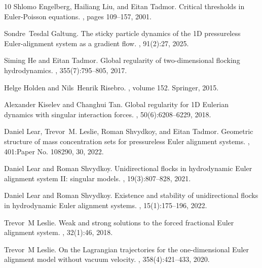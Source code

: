 \documentclass[11pt,reqno]{amsart}
\theoremstyle{definition}
\theoremstyle{remark}
\begin{document}
\begin{thebibliography}{10}
		Shlomo Engelberg, Hailiang Liu, and Eitan Tadmor.
		\newblock Critical thresholds in {E}uler-{P}oisson equations.
		, pages 109--157, 2001.
		
		Sondre~Tesdal Galtung.
		\newblock The sticky particle dynamics of the {1D} pressureless
		{E}uler-alignment system as a gradient flow.
		, 91(2):27, 2025.
		
		Siming He and Eitan Tadmor.
		\newblock Global regularity of two-dimensional flocking hydrodynamics.
		, 355(7):795--805, 2017.
		
		Helge Holden and Nils~Henrik Risebro.
		, volume 152.
		\newblock Springer, 2015.
		
		Alexander Kiselev and Changhui Tan.
		\newblock Global regularity for {1D} {E}ulerian dynamics with singular
		interaction forces.
		, 50(6):6208--6229, 2018.
		
		Daniel Lear, Trevor~M. Leslie, Roman Shvydkoy, and Eitan Tadmor.
		\newblock Geometric structure of mass concentration sets for pressureless
		{E}uler alignment systems.
		, 401:Paper No. 108290, 30, 2022.
		
		Daniel Lear and Roman Shvydkoy.
		\newblock Unidirectional flocks in hydrodynamic {E}uler alignment system {II}:
		singular models.
		, 19(3):807--828, 2021.
		
		Daniel Lear and Roman Shvydkoy.
		\newblock Existence and stability of unidirectional flocks in hydrodynamic
		{E}uler alignment systems.
		, 15(1):175--196, 2022.
		
		Trevor~M Leslie.
		\newblock Weak and strong solutions to the forced fractional {E}uler alignment
		system.
		, 32(1):46, 2018.
		
		Trevor~M Leslie.
		\newblock On the {L}agrangian trajectories for the one-dimensional {E}uler
		alignment model without vacuum velocity.
		, 358(4):421--433, 2020.
		

\end{thebibliography}
\end{document}
